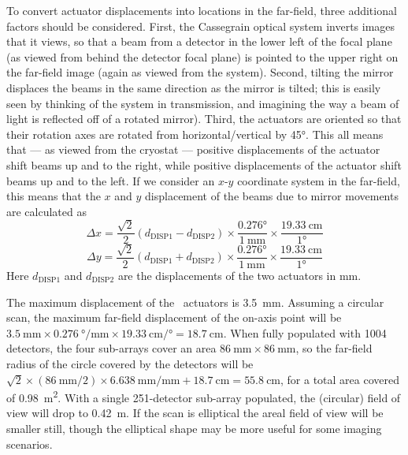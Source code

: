 To convert actuator displacements into locations in the far-field, three additional factors should be considered.
First, the Cassegrain optical system inverts images that it views, so that a beam from a detector in the lower left of the focal plane (as viewed from behind the detector focal plane) is pointed to the upper right on the far-field image (again as viewed from the system).
Second, tilting the mirror displaces the beams in the same direction as the mirror is tilted; this is easily seen by thinking of the system in transmission, and imagining the way a beam of light is reflected off of a rotated mirror).
Third, the actuators are oriented so that their rotation axes are rotated from horizontal/vertical by \ang{45}.
This all means that --- as viewed from the cryostat --- positive displacements of the  actuator shift beams up and to the right, while positive displacements of the  actuator shift beams up and to the left.
If we consider an $x$-$y$ coordinate system in the far-field, this means that the $x$ and $y$ displacement of the beams due to mirror movements are calculated as
\begin{equation} \label{eqn:ch5-bose-to-x}
\Delta x = \frac{\sqrt{2}}{2} \left( d_{\text{DISP1}} - d_{\text{DISP2}} \right) \times
    \frac{\ang{0.276}} {\SI{1}{\mm}} \times
    \frac{\SI{19.33}{\cm}} {\ang{1}}
\end{equation}
\begin{equation} \label{eqn:ch5-bose-to-y}
\Delta y = \frac{\sqrt{2}}{2} \left( d_{\text{DISP1}} + d_{\text{DISP2}} \right) \times
    \frac{\ang{0.276}} {\SI{1}{\mm}} \times
    \frac{\SI{19.33}{\cm}} {\ang{1}}
\end{equation}
Here $d_{\text{DISP1}}$ and $d_{\text{DISP2}}$ are the displacements of the two actuators in \si{\mm}.

The maximum displacement of the \BOSE\ actuators is \SI{3.5}{\mm}.
Assuming a circular scan, the maximum far-field displacement of the on-axis point will be $\SI{3.5}{\mm} \times \SI[per-mode=symbol]{0.276}{\degree\per\mm} \times \SI[per-mode=symbol]{19.33}{\cm\per\degree} = \SI{18.7}{\cm}$.
When fully populated with 1004 detectors, the four sub-arrays cover an area $\SI{86}{\mm} \times \SI{86}{\mm}$, so the far-field radius of the circle covered by the detectors will be $\sqrt{2} \times (\SI{86}{\mm}/2) \times \SI{6.638}{\mm\per\mm} + \SI{18.7}{\cm} = \SI{55.8}{\cm}$, for a total area covered of \SI{.98}{\m^2}.
With a single 251-detector sub-array populated, the (circular) field of view will drop to \SI{0.42}{\m}.
If the scan is elliptical the areal field of view will be smaller still, though the elliptical shape may be more useful for some imaging scenarios.

